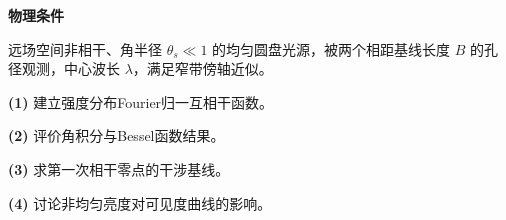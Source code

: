 \textbf{物理条件}\par 远场空间非相干、角半径 \(\theta_s\ll1\) 的均匀圆盘光源，被两个相距基线长度 \(B\) 的孔径观测，中心波长 \(\lambda\)，满足窄带傍轴近似。
\par\noindent\textbf{(1)} 建立强度分布Fourier归一互相干函数。
\par\noindent\textbf{(2)} 评价角积分与Bessel函数结果。
\par\noindent\textbf{(3)} 求第一次相干零点的干涉基线。
\par\noindent\textbf{(4)} 讨论非均匀亮度对可见度曲线的影响。
